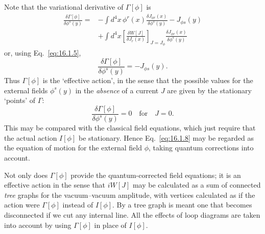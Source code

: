 Note that the variational derivative of $\Gamma[\phi]$ is
\begin{align*}
\frac{\delta\Gamma[\phi]}{\delta\phi^s(y)}
={}&-\int d^4x\,\phi^r(x)\frac{\delta J_{\phi r}(x)}{\delta\phi^s(y)}-J_{\phi s}(y)\\
&+\int d^4x\left[\frac{\delta W[J]}{\delta J_r(x)}\right]_{J=J_\phi}
\frac{\delta J_{\phi r}(x)}{\delta\phi^s(y)}
\end{align*}
or, using Eq.\ \eqref{eq:16.1.5},
\begin{equation}
\frac{\delta\Gamma[\phi]}{\delta\phi^s(y)}=-J_{\phi s}(y).
\label{eq:16.1.7}
\end{equation}
Thus $\Gamma[\phi]$ is the `effective action', in the sense that the possible values for
the external fields $\phi^s(y)$ in the \emph{absence} of a current $J$ are given by the
stationary `points' of $\Gamma$:
\begin{equation}
\frac{\delta\Gamma[\phi]}{\delta\phi^s(y)}=0\quad\text{for}\quad J=0.
\label{eq:16.1.8}
\end{equation}
This may be compared with the classical field equations, which just
require that the actual action $I[\phi]$ be stationary. Hence Eq.\ \eqref{eq:16.1.8} may
be regarded as the equation of motion for the external field $\phi$, taking
quantum corrections into account.

Not only does $\Gamma[\phi]$ provide the quantum-corrected field equations; it
is an effective action in the sense that $iW[J]$ may be calculated as a sum
of connected \emph{tree} graphs for the vacuum--vacuum amplitude, with vertices
calculated as if the action were $\Gamma[\phi]$ instead of $I[\phi]$. By a tree graph is
meant one that becomes disconnected if we cut any internal line. All the
effects of loop diagrams are taken into account by using $\Gamma[\phi]$ in place of
$I[\phi]$.

